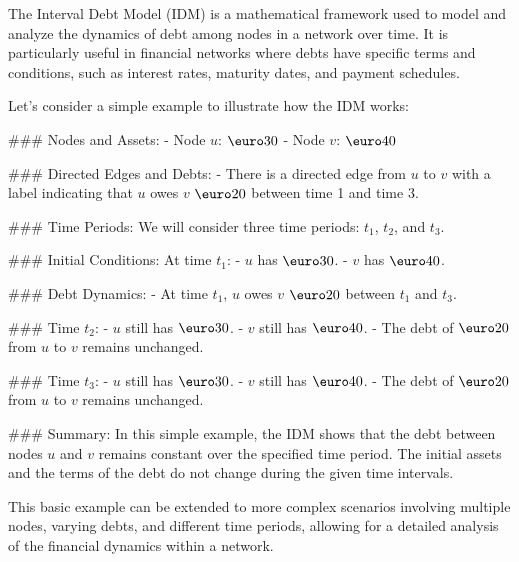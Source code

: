 The Interval Debt Model (IDM) is a mathematical framework used to model and analyze the dynamics of debt among nodes in a network over time. It is particularly useful in financial networks where debts have specific terms and conditions, such as interest rates, maturity dates, and payment schedules.

Let's consider a simple example to illustrate how the IDM works:

### Nodes and Assets:
- Node \( u \): \(\textup{\euro}30\)
- Node \( v \): \(\textup{\euro}40\)

### Directed Edges and Debts:
- There is a directed edge from \( u \) to \( v \) with a label indicating that \( u \) owes \( v \) \(\textup{\euro}20\) between time 1 and time 3.

### Time Periods:
We will consider three time periods: \( t_1 \), \( t_2 \), and \( t_3 \).

### Initial Conditions:
At time \( t_1 \):
- \( u \) has \(\textup{\euro}30\).
- \( v \) has \(\textup{\euro}40\).

### Debt Dynamics:
- At time \( t_1 \), \( u \) owes \( v \) \(\textup{\euro}20\) between \( t_1 \) and \( t_3 \).

### Time \( t_2 \):
- \( u \) still has \(\textup{\euro}30\).
- \( v \) still has \(\textup{\euro}40\).
- The debt of \(\textup{\euro}20\) from \( u \) to \( v \) remains unchanged.

### Time \( t_3 \):
- \( u \) still has \(\textup{\euro}30\).
- \( v \) still has \(\textup{\euro}40\).
- The debt of \(\textup{\euro}20\) from \( u \) to \( v \) remains unchanged.

### Summary:
In this simple example, the IDM shows that the debt between nodes \( u \) and \( v \) remains constant over the specified time period. The initial assets and the terms of the debt do not change during the given time intervals.

This basic example can be extended to more complex scenarios involving multiple nodes, varying debts, and different time periods, allowing for a detailed analysis of the financial dynamics within a network.